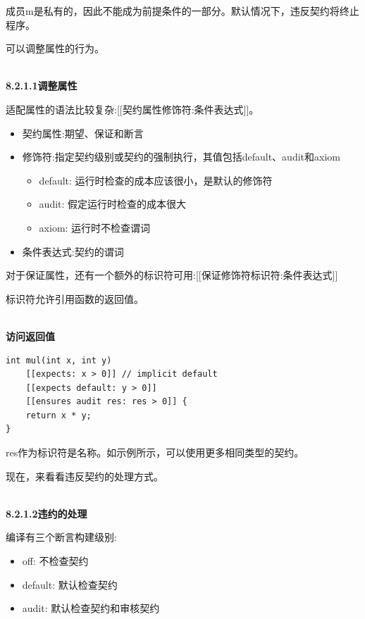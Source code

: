 成员m是私有的，因此不能成为前提条件的一部分。默认情况下，违反契约将终止程序。

可以调整属性的行为。

\hspace*{\fill} \\ %
\noindent
\textbf{8.2.1.1\hspace{0.2cm}调整属性}

适配属性的语法比较复杂:[[契约属性修饰符:条件表达式]]。

\begin{itemize}
\item 
契约属性:期望、保证和断言

\item 
修饰符:指定契约级别或契约的强制执行，其值包括default、audit和axiom
\begin{itemize}
\item 
default: 运行时检查的成本应该很小，是默认的修饰符

\item 
audit: 假定运行时检查的成本很大

\item 
axiom: 运行时不检查谓词
\end{itemize}

\item 
条件表达式:契约的谓词
\end{itemize}

对于保证属性，还有一个额外的标识符可用:[[保证修饰符标识符:条件表达式]]

标识符允许引用函数的返回值。

\hspace*{\fill} \\ %
\noindent
\textbf{访问返回值}
\begin{lstlisting}[style=styleCXX]
int mul(int x, int y)
	[[expects: x > 0]] // implicit default
	[[expects default: y > 0]]
	[[ensures audit res: res > 0]] {
	return x * y;
}
\end{lstlisting}

res作为标识符是名称。如示例所示，可以使用更多相同类型的契约。

现在，来看看违反契约的处理方式。

\hspace*{\fill} \\ %
\noindent
\textbf{8.2.1.2\hspace{0.2cm}违约的处理}

编译有三个断言构建级别:

\begin{itemize}
\item 
off: 不检查契约

\item 
default: 默认检查契约

\item 
audit: 默认检查契约和审核契约
\end{itemize}

